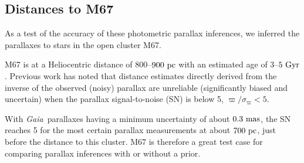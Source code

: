 \documentclass[modern]{aastex61}
\newcommand{\project}[1]{\textsl{#1}}
\newcommand{\gaia}{\project{Gaia}}
\begin{document}
\subsection{Distances to M67}
As a test of the accuracy of these photometric parallax inferences, we inferred the parallaxes to stars in the open cluster M67.

M67 is at a Heliocentric distance of $800$--$900~{\rm pc}$ with an estimated age of $3$--$5~{\rm Gyr}$.
Previous work \citep{cbj15} has noted that distance estimates directly derived from the inverse of the observed (noisy) parallax are unreliable (significantly biased and uncertain) when the parallax signal-to-noise (SN) is below 5, $\varpi / \sigma_\varpi < 5$.

With \gaia\ parallaxes having a minimum uncertainty of about $0.3~{\rm mas}$, the SN reaches 5 for the most certain parallax measurements at about $700~{\rm pc}$, just before the distance to this cluster.
M67 is therefore a great test case for comparing parallax inferences with or without a prior.
\end{document}
